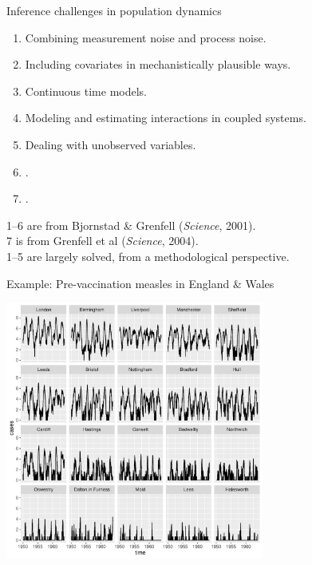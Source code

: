 \documentclass{beamer}
\begin{document}
\begin{frame}{Inference challenges in population dynamics}

  \begin{enumerate}
\item Combining measurement noise and process noise.
\item Including covariates in mechanistically plausible ways.
\item  Continuous time models.
\item  Modeling and estimating interactions in coupled systems.
\item  Dealing with unobserved variables.
\item  {}.
\item  {}.
  \end{enumerate}

  \vspace{3mm}
  
  1--6 are from Bjornstad \& Grenfell ({\it Science}, 2001).\\
  7 is from Grenfell et al ({\it Science}, 2004).\\
  1--5 are largely solved, from a methodological perspective.
  
  
\end{frame}

\begin{frame}{Example: Pre-vaccination measles in England \& Wales}

\vspace{-3mm}

\begin{center}
\includegraphics[width=8.5cm]{he10-data.pdf}


\end{center}

\vspace{-2mm}
  
\end{frame}
\end{document}
